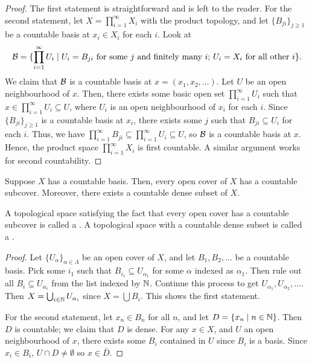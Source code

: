 \begin{proof}
    The first statement is straightforward and is left to the reader. For the second statement, let $X = \prod_{i=1}^{\infty} X_{i}$ with the product topology, and let $\{B_{ji}\}_{j \geq 1}$ be a countable basis at $x_{i} \in X_{i}$ for each $i$. Look at
    \begin{align}
        \mathcal{B} = \{\prod_{i=1}^{\infty} U_{i} \mid U_{i} = B_{ji} \text{ for some } j \text{ and finitely many } i\text{; } U_{i} = X_{i} \text{ for all other } i\}.
    \end{align}
    We claim that $\mathcal{B}$ is a countable basis at $x = (x_{1}, x_{2}, \ldots)$. Let $U$ be an open neighbourhood of $x$. Then, there exists some basic open set $\prod_{i=1}^{\infty} U_{i}$ such that $x \in \prod_{i=1}^{\infty} U_{i} \subseteq U$, where $U_{i}$ is an open neighbourhood of $x_{i}$ for each $i$. Since $\{B_{ji}\}_{j \geq 1}$ is a countable basis at $x_{i}$, there exists some $j$ such that $B_{ji} \subseteq U_{i}$ for each $i$. Thus, we have $\prod_{i=1}^{\infty} B_{ji} \subseteq \prod_{i=1}^{\infty} U_{i} \subseteq U$, so $\mathcal{B}$ is a countable basis at $x$. Hence, the product space $\prod_{i=1}^{\infty} X_{i}$ is first countable. A similar argument works for second countability.
\end{proof}

\begin{theorem}
    Suppose $X$ has a countable basis. Then, every open cover of $X$ has a countable subcover. Moreover, there exists a countable dense subset of $X$.
\end{theorem}
A topological space satisfying the fact that every open cover has a countable subcover is called a . A topological space with a countable dense subset is called a .
\begin{proof}
    Let $\{U_{\alpha}\}_{\alpha \in \Lambda}$ be an open cover of $X$, and let $B_{1},B_{2},\ldots$ be a countable basis. Pick some $i_{1}$ such that $B_{i_{1}} \subseteq U_{\alpha_{1}}$ for some $\alpha$ indexed as $\alpha_{1}$. Then rule out all $B_{i} \subseteq U_{\alpha_{i}}$ from the list indexed by $\mathbb{N}$. Continue this process to get $U_{\alpha_{1}},U_{\alpha_{2}},\ldots$. Then $X = \bigcup_{i \in \mathbb{N}} U_{\alpha_{i}}$ since $X = \bigcup B_{i}$. This shows the first statement.

    For the second statement, let $x_{n} \in B_{n}$ for all $n$, and let $D = \{x_{n} \mid n \in \mathbb{N}\}$. Then $D$ is countable; we claim that $D$ is dense. For any $x \in X$, and $U$ an open neighbourhood of $x$, there exists some $B_{i}$ contained in $U$ since $B_{i}$ is a basis. Since $x_{i} \in B_{i}$, $U \cap D \neq \emptyset$ so $x \in \bar{D}$.
\end{proof}

